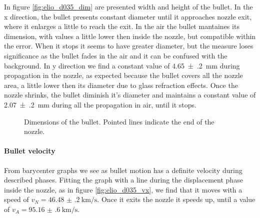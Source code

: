 In figure \ref{fig:elio_d035_dim} are presented width and height of the bullet.
In the x direction, the bullet presents constant diameter until it approaches nozzle exit, where it enlarges a little to reach the exit. In the air the bullet mantaines its dimension, with values a little lower then inside the nozzle, but compatible within the error. When it stops it seems to have greater diameter, but the measure loses significance as the bullet fades in the air and it can be confused with the background.
In y direction we find a constant value of \SI{4.65(20)}{\milli\meter} during propagation in the nozzle, as expected because the bullet covers all the nozzle area, a little lower then its diameter due to glass refraction effects. Once the nozzle shrinks, the bullet diminish it's diameter and maintains a constant value of \SI{2.07(20)}{\milli\meter} during all the propagation in air, until it stops.
\begin{figure}
 \centering
 \hfill
 \caption{Dimensions of the bullet. Pointed lines indicate the end of the nozzle.}
 \label{fig:elio_d035_I}
\end{figure}


\paragraph{Bullet velocity}
From barycenter graphs we see as bullet motion has a definite velocity during described phases.
Fitting the graph with a line during the displacement phase inside the nozzle, as in figure \ref{fig:elio_d035_vx}, we find that it moves with a speed of $v_{N} = \SI{46.48(20)}{\kilo\meter/\second}$. Once it exits the nozzle it speeds up, until a value of $v_{A} = \SI{95.16(60)}{\kilo\meter/\second}$.


